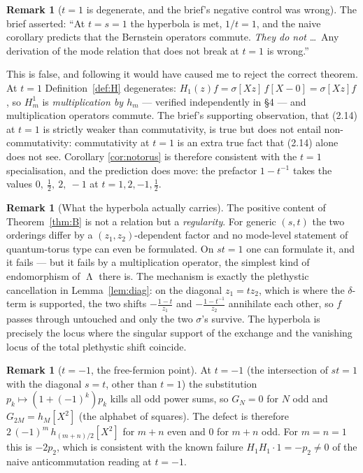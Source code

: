 \documentclass[11pt]{article}
\theoremstyle{definition}
\newtheorem{remark}[theorem]{Remark}
\DeclareMathOperator{\Lam}{\Lambda}
\newcommand{\Hop}{H}
\begin{document}
\begin{remark}[$t=1$ is degenerate, and the brief's negative control was wrong]
\label{rem:control}
The brief asserted: ``At $t=s=1$ the hyperbola is met, $1/t=1$, and the naive corollary
predicts that the Bernstein operators commute. \emph{They do not} \dots\ Any derivation of the
mode relation that does not break at $t=1$ is wrong.''

This is false, and following it would have caused me to reject the correct theorem. At $t=1$
Definition~\ref{def:H} degenerates: $\Hop_1(z)f=\sigma[Xz]\,f[X-0]=\sigma[Xz]f$, so
$\Hop^{1}_m$ is \emph{multiplication by $h_m$} --- verified independently in \S4 --- and
multiplication operators commute. The brief's supporting observation, that (2.14) at $t=1$ is
strictly weaker than commutativity, is true but does not entail non-commutativity:
commutativity at $t=1$ is an extra true fact that (2.14) alone does not see. Corollary
\ref{cor:notorus} is therefore consistent with the $t=1$ specialisation, and the prediction
does move: the prefactor $1-t^{-1}$ takes the values $0,\ \tfrac12,\ 2,\ -1$ at
$t=1,2,-1,\tfrac12$.
\end{remark}

\begin{remark}[What the hyperbola actually carries]
The positive content of Theorem~\ref{thm:B} is not a relation but a \emph{regularity}. For
generic $(s,t)$ the two orderings differ by a $(z_1,z_2)$-dependent factor and no mode-level
statement of quantum-torus type can even be formulated. On $st=1$ one can formulate it, and it
fails --- but it fails by a multiplication operator, the simplest kind of endomorphism of
$\Lam$ there is. The mechanism is exactly the plethystic cancellation in
Lemma~\ref{lem:diag}: on the diagonal $z_1=tz_2$, which is where the $\delta$-term is
supported, the two shifts $-\frac{1-t}{z_1}$ and $-\frac{1-t^{-1}}{z_2}$ annihilate each
other, so $f$ passes through untouched and only the two $\sigma$'s survive. The hyperbola is
precisely the locus where the singular support of the exchange and the vanishing locus of the
total plethystic shift coincide.
\end{remark}

\begin{remark}[$t=-1$, the free-fermion point]\label{rem:fermion}
At $t=-1$ (the intersection of $st=1$ with the diagonal $s=t$, other than $t=1$) the
substitution $p_k\mapsto(1+(-1)^k)p_k$ kills all odd power sums, so $G_N=0$ for $N$ odd and
$G_{2M}=h_M[X^2]$ (the alphabet of squares). The defect is therefore
$2\,(-1)^{m}\,h_{(m+n)/2}[X^2]$ for $m+n$ even and $0$ for $m+n$ odd. For $m=n=1$ this is
$-2p_2$, which is consistent with the known failure $\Hop_1\Hop_1\cdot 1=-p_2\neq0$ of the
naive anticommutation reading at $t=-1$.
\end{remark}
\end{document}
